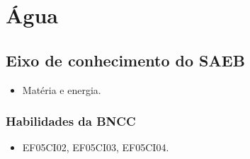 \chapter{Água}

\section*{Eixo de conhecimento do SAEB}
\begin{itemize}
	\item Matéria e energia.
\end{itemize}

\subsection{Habilidades da BNCC}

\begin{itemize}
\item EF05CI02, EF05CI03, EF05CI04.
\end{itemize}

